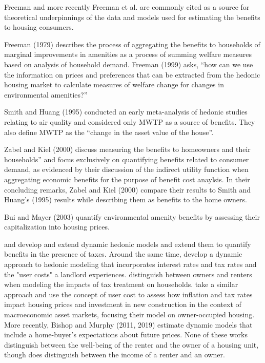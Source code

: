 \documentclass[ecta,nameyear,draft]{econsocart}
\theoremstyle{plain}
\theoremstyle{remark}
\begin{document}
Freeman and more recently Freeman et al. are commonly cited as a source for theoretical underpinnings of the data and models used for estimating the benefits to housing consumers.  

Freeman (1979) describes the process of aggregating the benefits to households of marginal improvements in amenities as a process of summing welfare measures based on analysis of household demand. Freeman (1999) asks, “how can we use the information on prices and preferences that can be extracted from the hedonic housing market to calculate  measures of welfare change for changes in environmental amenities?” 



Smith and Huang (1995) conducted an early meta-analysis of hedonic studies relating to air quality and considered only MWTP as a source of benefits. They also define MWTP as the “change in the asset value of the house”. 

Zabel and Kiel (2000) discuss measuring the benefits to homeowners and their households” and focus exclusively on quantifying benefits related to consumer demand, as evidenced by their discussion of the indirect utility function when aggregating economic benefits for the purpose of benefit cost anaylsis. In their concluding remarks, Zabel and Kiel (2000) compare their results to Smith and Huang’s (1995) results while describing them as benefits to the home owners. 

Bui and Mayer (2003) quantify environmental amenity benefits by assessing their capitalization into housing prices. 

\cite{niskanen77} and \cite{freeman80} develop and extend dynamic hedonic models and extend them to quantify benefits in the presence of taxes. Around the same time, \cite{sonstelie80} develop a dynamic approach to hedonic modeling that incorporates interest rates and tax rates and the "user costs" a landlord experiences. \cite{hendershott83} distinguish between owners and renters when modeling the impacts of tax treatment on households. \cite{poterba84} take a similar approach and use the concept of user cost to assess how inflation and tax rates impact housing prices and investment in new construction in the context of macroeconomic asset markets, focusing their model on owner-occupied housing. More recently, Bishop and Murphy (2011, 2019) estimate dynamic models that include a home-buyer's expectations about future prices. None of these works distinguish between the well-being of the renter and the owner of a housing unit, though \cite{hendershott83} does distinguish between the income of a renter and an owner.
\end{document}
